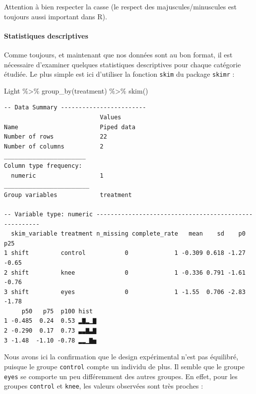 \documentclass[
  a4paper,
]{article}
\newenvironment{Shaded}{\begin{snugshade}}{\end{snugshade}}
\newcommand{\FunctionTok}[1]{\textcolor[rgb]{0.39,0.29,0.61}{#1}}
\newcommand{\NormalTok}[1]{\textcolor[rgb]{0.12,0.11,0.11}{#1}}
\newcommand{\SpecialCharTok}[1]{\textcolor[rgb]{0.24,0.68,0.91}{#1}}
\begin{document}
Attention à bien respecter la casse (le respect des majuscules/minuscules est toujours aussi important dans R).

\hypertarget{statistiques-descriptives-3}{%
\paragraph{Statistiques descriptives}\label{statistiques-descriptives-3}}

Comme toujours, et maintenant que nos données sont au bon format, il est nécessaire d'examiner quelques statistiques descriptives pour chaque catégorie étudiée. Le plus simple est ici d'utiliser la fonction \texttt{skim} du package \texttt{skimr} :

\begin{Shaded}
\begin{Highlighting}[]
\NormalTok{Light }\SpecialCharTok{\%\textgreater{}\%} 
  \FunctionTok{group\_by}\NormalTok{(treatment) }\SpecialCharTok{\%\textgreater{}\%} 
  \FunctionTok{skim}\NormalTok{()}
\end{Highlighting}
\end{Shaded}

\begin{verbatim}
-- Data Summary ------------------------
                           Values    
Name                       Piped data
Number of rows             22        
Number of columns          2         
_______________________              
Column type frequency:               
  numeric                  1         
________________________             
Group variables            treatment 

-- Variable type: numeric ------------------------------------------------------
  skim_variable treatment n_missing complete_rate   mean    sd    p0   p25
1 shift         control           0             1 -0.309 0.618 -1.27 -0.65
2 shift         knee              0             1 -0.336 0.791 -1.61 -0.76
3 shift         eyes              0             1 -1.55  0.706 -2.83 -1.78
     p50   p75  p100 hist 
1 -0.485  0.24  0.53 ▂▇▂▁▇
2 -0.290  0.17  0.73 ▃▃▇▃▇
3 -1.48  -1.10 -0.78 ▂▂▁▇▅
\end{verbatim}

Nous avons ici la confirmation que le design expérimental n'est pas équilibré, puisque le groupe \texttt{control} compte un individu de plus. Il semble que le groupe \texttt{eyes} se comporte un peu différemment des autres groupes. En effet, pour les groupes \texttt{control} et \texttt{knee}, les valeurs observées sont très proches :
\end{document}
